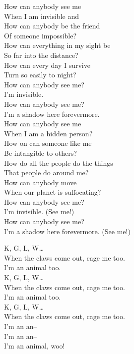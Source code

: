 


How can anybody see me \\
When I am invisible and \\
How can anybody be the friend \\
Of someone impossible? \\
How can everything in my sight be \\
So far into the distance? \\
How can every day I survive \\
Turn so easily to night? \\

How can anybody see me? \\
I'm invisible. \\
How can anybody see me? \\
I'm a shadow here forevermore. \\

How can anybody see me \\
When I am a hidden person? \\
How on  can someone like me \\
Be intangible to others? \\
How do all the people do the things \\
That people do around me? \\
How can anybody move \\
When our planet is suffocating? \\

How can anybody see me? \\
I'm invisible. (See me!) \\
How can anybody see me? \\
I'm a shadow here forevermore. (See me!) \\




K, G, L, W… \\

When the claws come out, cage me too. \\
I'm an animal too. \\

K, G, L, W… \\

When the claws come out, cage me too. \\
I'm an animal too. \\

K, G, L, W… \\

When the claws come out, cage me too. \\
I'm an an-- \\
I'm an an-- \\
I'm an animal, woo! \\
